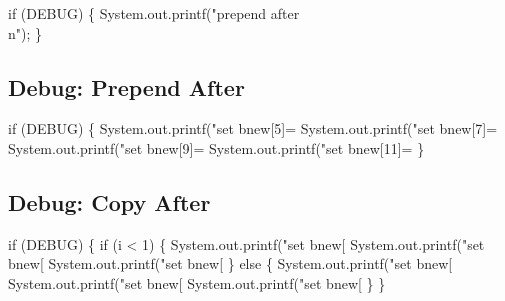 \nwenddocs{}\endmoddef\nwstartdeflinemarkup{}\nwenddeflinemarkup
if (DEBUG) \{
  System.out.printf("prepend after\\n");
\}
\nwendcode{}\nwdocspar

\subsection{Debug: Prepend After}

\nwenddocs{}\endmoddef\nwstartdeflinemarkup{}\nwenddeflinemarkup
if (DEBUG) \{
  System.out.printf("set bnew[5]=%
  System.out.printf("set bnew[7]=%
  System.out.printf("set bnew[9]=%
  System.out.printf("set bnew[11]=%
\}
\nwendcode{}\nwdocspar

\subsection{Debug: Copy After}

\nwenddocs{}\endmoddef\nwstartdeflinemarkup{}\nwenddeflinemarkup
if (DEBUG) \{
  if (i < 1) \{
    System.out.printf("set bnew[%
    System.out.printf("set bnew[%
    System.out.printf("set bnew[%
  \} else \{
    System.out.printf("set bnew[%
    System.out.printf("set bnew[%
    System.out.printf("set bnew[%
  \}
\}
\nwendcode{}\nwdocspar

